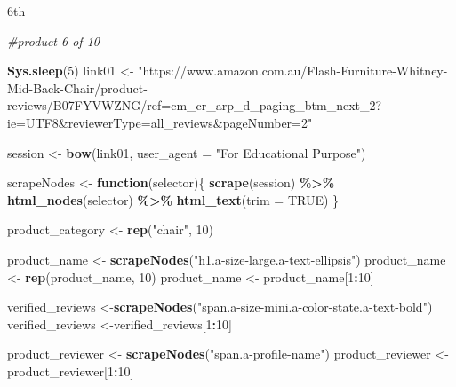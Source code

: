 \documentclass[
]{article}
\newenvironment{Shaded}{\begin{snugshade}}{\end{snugshade}}
\newcommand{\AttributeTok}[1]{\textcolor[rgb]{0.13,0.29,0.53}{#1}}
\newcommand{\CommentTok}[1]{\textcolor[rgb]{0.56,0.35,0.01}{\textit{#1}}}
\newcommand{\ConstantTok}[1]{\textcolor[rgb]{0.56,0.35,0.01}{#1}}
\newcommand{\ControlFlowTok}[1]{\textcolor[rgb]{0.13,0.29,0.53}{\textbf{#1}}}
\newcommand{\DecValTok}[1]{\textcolor[rgb]{0.00,0.00,0.81}{#1}}
\newcommand{\FunctionTok}[1]{\textcolor[rgb]{0.13,0.29,0.53}{\textbf{#1}}}
\newcommand{\NormalTok}[1]{#1}
\newcommand{\OtherTok}[1]{\textcolor[rgb]{0.56,0.35,0.01}{#1}}
\newcommand{\SpecialCharTok}[1]{\textcolor[rgb]{0.81,0.36,0.00}{\textbf{#1}}}
\newcommand{\StringTok}[1]{\textcolor[rgb]{0.31,0.60,0.02}{#1}}
\begin{document}
6th

\begin{Shaded}
\begin{Highlighting}[]
\CommentTok{\#product 6 of 10}
  
\FunctionTok{Sys.sleep}\NormalTok{(}\DecValTok{5}\NormalTok{)}
\NormalTok{link01 }\OtherTok{\textless{}{-}} \StringTok{"https://www.amazon.com.au/Flash{-}Furniture{-}Whitney{-}Mid{-}Back{-}Chair/product{-}reviews/B07FYVWZNG/ref=cm\_cr\_arp\_d\_paging\_btm\_next\_2?ie=UTF8\&reviewerType=all\_reviews\&pageNumber=2"}


\NormalTok{  session }\OtherTok{\textless{}{-}} \FunctionTok{bow}\NormalTok{(link01,}
               \AttributeTok{user\_agent =} \StringTok{"For Educational Purpose"}\NormalTok{)}

\NormalTok{  scrapeNodes }\OtherTok{\textless{}{-}} \ControlFlowTok{function}\NormalTok{(selector)\{}
    \FunctionTok{scrape}\NormalTok{(session) }\SpecialCharTok{\%\textgreater{}\%}
      \FunctionTok{html\_nodes}\NormalTok{(selector) }\SpecialCharTok{\%\textgreater{}\%}
      \FunctionTok{html\_text}\NormalTok{(}\AttributeTok{trim =} \ConstantTok{TRUE}\NormalTok{)}
\NormalTok{  \}}

\NormalTok{  product\_category }\OtherTok{\textless{}{-}} \FunctionTok{rep}\NormalTok{(}\StringTok{"chair"}\NormalTok{, }\DecValTok{10}\NormalTok{)}

\NormalTok{  product\_name }\OtherTok{\textless{}{-}} \FunctionTok{scrapeNodes}\NormalTok{(}\StringTok{"h1.a{-}size{-}large.a{-}text{-}ellipsis"}\NormalTok{)}
\NormalTok{  product\_name }\OtherTok{\textless{}{-}} \FunctionTok{rep}\NormalTok{(product\_name, }\DecValTok{10}\NormalTok{)}
\NormalTok{  product\_name }\OtherTok{\textless{}{-}}\NormalTok{ product\_name[}\DecValTok{1}\SpecialCharTok{:}\DecValTok{10}\NormalTok{]}
  
\NormalTok{  verified\_reviews }\OtherTok{\textless{}{-}}\FunctionTok{scrapeNodes}\NormalTok{(}\StringTok{"span.a{-}size{-}mini.a{-}color{-}state.a{-}text{-}bold"}\NormalTok{)}
\NormalTok{  verified\_reviews }\OtherTok{\textless{}{-}}\NormalTok{verified\_reviews[}\DecValTok{1}\SpecialCharTok{:}\DecValTok{10}\NormalTok{]}
  
\NormalTok{  product\_reviewer }\OtherTok{\textless{}{-}} \FunctionTok{scrapeNodes}\NormalTok{(}\StringTok{"span.a{-}profile{-}name"}\NormalTok{)}
\NormalTok{  product\_reviewer }\OtherTok{\textless{}{-}}\NormalTok{ product\_reviewer[}\DecValTok{1}\SpecialCharTok{:}\DecValTok{10}\NormalTok{]}
  

\end{Highlighting}
\end{Shaded}
\end{document}
